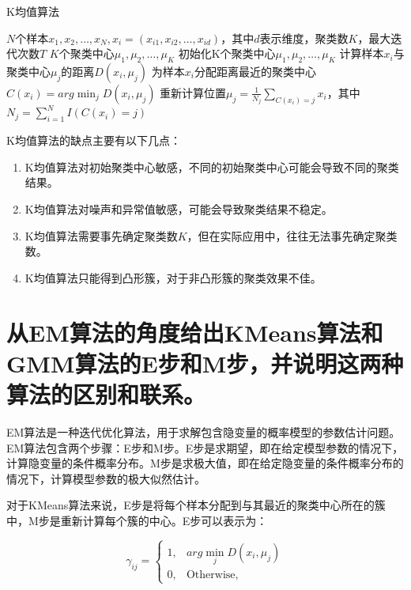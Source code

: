 \documentclass{article}
\begin{document}
\begin{algorithm}[htbp]
    \caption{K均值算法}
    \label{alg:kmeans}
    \begin{algorithmic}[1]
        \Require $N$个样本$x_1,x_2,\dots,x_N, x_i=(x_{i1},x_{i2},\dots,x_{id})$，其中$d$表示维度，聚类数$K$，最大迭代次数$T$
        \Ensure $K$个聚类中心$\mu_1,\mu_2,\dots,\mu_K$
        \State 初始化K个聚类中心$\mu_1,\mu_2,\dots,\mu_K$
        \Repeat
                    \State 计算样本$x_i$与聚类中心$\mu_j$的距离$D(x_i,\mu_j)$
                \EndFor
                \State 为样本$x_i$分配距离最近的聚类中心$C(x_i)=arg\min_jD(x_i,\mu_j)$
            \EndFor
                \State 重新计算位置$\mu_j=\frac{1}{N_j}\sum_{C(x_i)=j}x_i$，其中$N_j=\sum_{i=1}^{N}I(C(x_i)=j)$
            \EndFor
    \end{algorithmic}
\end{algorithm}

K均值算法的缺点主要有以下几点：

\begin{enumerate}
    \item K均值算法对初始聚类中心敏感，不同的初始聚类中心可能会导致不同的聚类结果。
    \item K均值算法对噪声和异常值敏感，可能会导致聚类结果不稳定。
    \item K均值算法需要事先确定聚类数$K$，但在实际应用中，往往无法事先确定聚类数。
    \item K均值算法只能得到凸形簇，对于非凸形簇的聚类效果不佳。
\end{enumerate}

\section{从EM算法的角度给出KMeans算法和GMM算法的E步和M步，并说明这两种算法的区别和联系。}

EM算法是一种迭代优化算法，用于求解包含隐变量的概率模型的参数估计问题。EM算法包含两个步骤：E步和M步。E步是求期望，即在给定模型参数的情况下，计算隐变量的条件概率分布。M步是求极大值，即在给定隐变量的条件概率分布的情况下，计算模型参数的极大似然估计。

对于KMeans算法来说，E步是将每个样本分配到与其最近的聚类中心所在的簇中，M步是重新计算每个簇的中心。E步可以表示为：

\begin{equation}
    \gamma_{ij} = \begin{cases}
        1, & arg\min_jD(x_i,\mu_j) \\
        0, & \text{Otherwise},
    \end{cases}
\end{equation}
\end{document}
